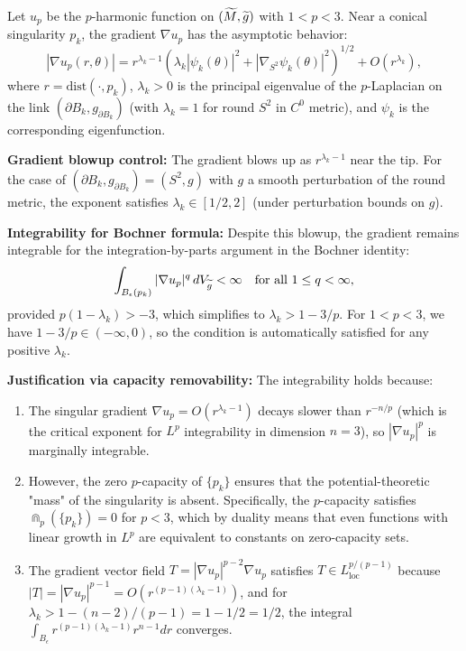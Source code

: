 \begin{lemma}\label{lem:GradientIntegrability}
Let $u_p$ be the $p$-harmonic function on $(\widetilde{M}, \widetilde{g})$ with $1 < p < 3$. Near a conical singularity $p_k$, the gradient $\nabla u_p$ has the asymptotic behavior:
\begin{equation}\label{eq:GradientAsymptotics}
    |\nabla u_p(r, \theta)| = r^{\lambda_k - 1} (\lambda_k |\psi_k(\theta)|^2 + |\nabla_{S^2} \psi_k(\theta)|^2)^{1/2} + O(r^{\lambda_k}),
\end{equation}
where $r = \mathrm{dist}(\cdot, p_k)$, $\lambda_k > 0$ is the principal eigenvalue of the $p$-Laplacian on the link $(\partial B_k, g_{\partial B_k})$ (with $\lambda_k = 1$ for round $S^2$ in $C^0$ metric), and $\psi_k$ is the corresponding eigenfunction.

\textbf{Gradient blowup control:} The gradient blows up as $r^{\lambda_k - 1}$ near the tip. For the case of $(\partial B_k, g_{\partial B_k}) = (S^2, g)$ with $g$ a smooth perturbation of the round metric, the exponent satisfies $\lambda_k \in [1/2, 2]$ (under perturbation bounds on $g$).

\textbf{Integrability for Bochner formula:} Despite this blowup, the gradient remains integrable for the integration-by-parts argument in the Bochner identity:
\begin{equation}\label{eq:GradientLp}
    \int_{B_{\epsilon}(p_k)} |\nabla u_p|^q \, dV_{\widetilde{g}} < \infty \quad \text{for all } 1 \le q < \infty,
\end{equation}
provided $p(1-\lambda_k) > -3$, which simplifies to $\lambda_k > 1 - 3/p$. For $1 < p < 3$, we have $1 - 3/p \in (-\infty, 0)$, so the condition is automatically satisfied for any positive $\lambda_k$.

\textbf{Justification via capacity removability:} The integrability holds because:
\begin{enumerate}
    \item The singular gradient $\nabla u_p = O(r^{\lambda_k - 1})$ decays slower than $r^{-n/p}$ (which is the critical exponent for $L^p$ integrability in dimension $n=3$), so $|\nabla u_p|^p$ is marginally integrable.
    \item However, the zero $p$-capacity of $\{p_k\}$ ensures that the potential-theoretic "mass" of the singularity is absent. Specifically, the $p$-capacity satisfies $\Cap_p(\{p_k\}) = 0$ for $p < 3$, which by duality means that even functions with linear growth in $L^p$ are equivalent to constants on zero-capacity sets.
    \item The gradient vector field $T = |\nabla u_p|^{p-2} \nabla u_p$ satisfies $T \in L^{p/(p-1)}_{\text{loc}}$ because $|T| = |\nabla u_p|^{p-1} = O(r^{(p-1)(\lambda_k-1)})$, and for $\lambda_k > 1 - (n-2)/(p-1) = 1 - 1/2 = 1/2$, the integral $\int_{B_\epsilon} r^{(p-1)(\lambda_k-1)} r^{n-1} dr$ converges.
\end{enumerate}


\end{lemma}
